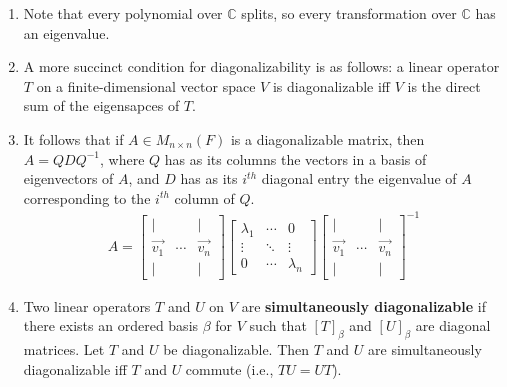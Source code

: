 \documentclass[10pt]{article}
\begin{document}
\begin{multicols*}{2}
\begin{enumerate}
\begin{enumerate}
        \item Note that every polynomial over $\mathbb{C}$ splits, so every transformation over $\mathbb{C}$ has an eigenvalue.
        \item A more succinct condition for diagonalizability is as follows: a linear operator $T$ on a finite-dimensional vector space $V$ is diagonalizable iff $V$ is the direct sum of the eigensapces of $T$. 
        \item It follows that if $A \in M_{n \times n}(F)$ is a diagonalizable matrix, then $A=QDQ^{-1}$, where $Q$ has as its columns the vectors in a basis of eigenvectors of $A$, and $D$ has as its $i^{th}$ diagonal entry the eigenvalue of $A$ corresponding to the $i^{th}$ column of $Q$.
        \begin{align*}
            A=\begin{bmatrix} 
            | & & | \\
            \vec{v_1} & \cdots & \vec{v_n} \\
            | & & |
            \end{bmatrix}
            \begin{bmatrix}
            \lambda_1 & \cdots & 0 \\
            \vdots & \ddots & \vdots \\
            0 & \cdots & \lambda_n
            \end{bmatrix}
            \begin{bmatrix} 
            | & & | \\
            \vec{v_1} & \cdots & \vec{v_n} \\
            | & & |
            \end{bmatrix}^{-1}
        \end{align*}
        
        \item Two linear operators $T$ and $U$ on $V$ are \textbf{simultaneously diagonalizable} if there exists an ordered basis $\beta$ for $V$ such that $[T]_\beta$ and $[U]_\beta$ are diagonal matrices. Let $T$ and $U$ be diagonalizable. Then $T$ and $U$ are simultaneously diagonalizable iff $T$ and $U$ commute (i.e., $TU=UT$).
        

\end{enumerate}
\end{enumerate}
\end{multicols*}
\end{document}
